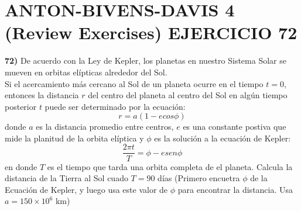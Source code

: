 \chapter*{ANTON-BIVENS-DAVIS 4 (Review Exercises) EJERCICIO 72}
\textbf{72)} De acuerdo con la Ley de Kepler, los planetas en nuestro Sistema Solar  se mueven en orbitas elípticas alrededor del Sol.\\
Si el acercamiento más cercano al Sol de un planeta ocurre en el tiempo $t=0$, entonces la distancia $r$ del centro del planeta al centro del Sol en algún tiempo posterior $t$ puede ser determinado por la ecuación:
\[
r = a(1-ecos \phi)
\]
donde  $a$ es la distancia promedio entre centros, $e$ es una constante postiva que mide la planitud de la orbita elíptica y $\phi$ es la solución a la ecuación de Kepler:
\[
\frac{2\pi t}{T} = \phi - e sen\phi
\]
en donde $T$ es el tiempo que tarda una orbita completa de el planeta. Calcula la distancia de la Tierra al Sol cuado $T=90$ días (Primero encuetra $\phi$ de la Ecuación de Kepler, y luego usa este valor de $\phi$ para encontrar la distancia. Usa $a = 150 \times 10^{6}$ km) \\

